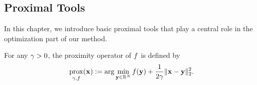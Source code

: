 \documentclass[10pt,journal]{IEEEtran}
\DeclareMathOperator{\prox}{prox}
\begin{document}
\subsection{Proximal Tools}
\label{subsec:Prox}
In this chapter, we introduce basic proximal tools that play a central role in the optimization part of our method.

For any $\gamma > 0$, the proximity operator of $f$ is defined by
\begin{equation}
    \label{eq:Prox}
    \prox_{\IndexProx, \FuncProx}(\VarProxOne) := \arg\min_{\VarProxTwo \in \RealSpace{\NumVarProx}} \FuncProx(\VarProxTwo) + \frac{1}{2 \IndexProx} \| \VarProxOne - \VarProxTwo \|_{2}^{2}.
\end{equation}
\end{document}
